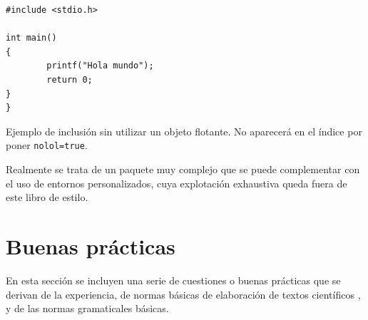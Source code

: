 \begin{lstlisting}[caption=Ejemplo ]
#include <stdio.h>

int main()
{
        printf("Hola mundo");
        return 0;
}
}
\end{lstlisting}


Ejemplo de inclusión sin utilizar un objeto flotante. No aparecerá en el índice por poner \lstinline[language=enparrafo]!nolol=true!.







Realmente se trata de un paquete muy complejo que se puede complementar con el uso de entornos personalizados, cuya explotación exhaustiva queda fuera de este libro de estilo.


\chapter {Buenas prácticas}


En esta sección se incluyen una serie de cuestiones o buenas prácticas que se derivan de la experiencia, de normas básicas de elaboración de textos científicos \cite{alba2009}, y de las normas gramaticales básicas.


